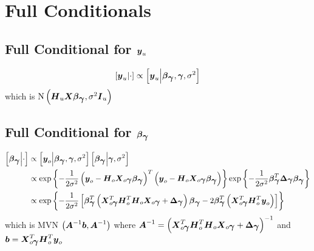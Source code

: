 \documentclass[fleqn]{article}
\def\bm#1{\mbox{\boldmath $#1$}}
\begin{document}
\section{Full Conditionals}
\subsection{Full Conditional for $\bm{y}_u$}
%
\begin{align*}
%
\left[ \bm{y}_u \middle| \cdot \right] & \propto \left[ \bm{y}_u \middle| \bm{\beta}_{\bm{\gamma}}, \bm{\gamma}, \sigma^2 \right] \\
%
\end{align*}
%
which is $\mbox{N}\left( \bm{H}_u \bm{X} \bm{\beta}_{\bm{\gamma}}, \sigma^2 \bm{I}_u \right)$
\subsection{Full Conditional for $\bm{\beta}_{\bm{\gamma}}$}
%
\begin{align*}
%
\left[ \bm{\beta}_{\bm{\gamma}} \middle| \cdot \right] & \propto \left[ \bm{y}_o \middle| \bm{\beta}_{\bm{\gamma}}, \bm{\gamma}, \sigma^2 \right] \left[ \bm{\beta}_{\bm{\gamma}} \middle|  \bm{\gamma}, \sigma^2 \right] \\
%
 & \propto \exp{ \left\{ - \frac{1} {2 \sigma^2} \left( \bm{y}_o - \bm{H}_o \bm{X}_{o \bm{\gamma}} \bm{\beta}_{\bm{\gamma}} \right)^T \left( \bm{y}_o - \bm{H}_o \bm{X}_{o \bm{\gamma}} \bm{\beta}_{\bm{\gamma}} \right) \right\} } \exp{ \left\{ - \frac{1} {2 \sigma^2} \bm{\beta}_{\bm{\gamma}}^T \bm{\Delta}_{\bm{\gamma}} \bm{\beta}_{\bm{\gamma}} \right\} } \\
%
 & \propto \exp{ \left\{ - \frac{1} {2 \sigma^2} \left[ \bm{\beta}_{\bm{\gamma}}^T \left(\bm{X}_{o \bm{\gamma}}^T \bm{H}_o^T \bm{H}_o \bm{X}_{o \bm{\gamma}} + \bm{\Delta}_{\bm{\gamma}} \right) \bm{\beta}_{\bm{\gamma}} - 2 \bm{\beta}_{\bm{\gamma}}^T \left( \bm{X}_{o \bm{\gamma}}^T \bm{H}_o^T \bm{y}_o \right) \right] \right\} } \\
%
\end{align*}
%
which is MVN $\left( \bm{A}^{ - 1} \bm{b}, \bm{A}^{ - 1} \right)$ where $\bm{A}^{ - 1} = \left( \bm{X}_{o \bm{\gamma}}^T \bm{H}_o^T \bm{H}_o \bm{X}_{o \bm{\gamma}} + \bm{\Delta}_{\bm{\gamma}} \right)^{ - 1}$ and $\bm{b} = \bm{X}_{o \bm{\gamma}}^T \bm{H}_o^T \bm{y}_o$
%
\end{document}
